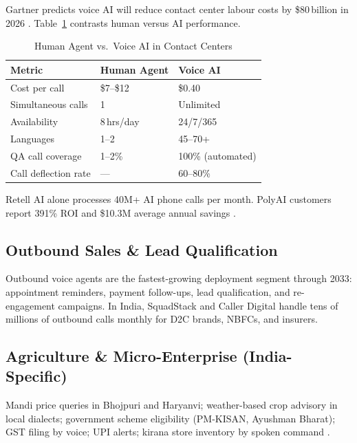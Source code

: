 \documentclass[12pt,a4paper]{article}
\begin{document}
Gartner predicts voice AI will reduce contact center labour costs by
\$80\,billion in 2026 \cite{nextlevel-roi}.  Table~\ref{tab:contact-center}
contrasts human versus AI performance.

\begin{table}[H]\centering
\caption{Human Agent vs.\ Voice AI in Contact Centers}
\label{tab:contact-center}
\begin{tabularx}{\textwidth}{lXX}
\toprule
\textbf{Metric} & \textbf{Human Agent} & \textbf{Voice AI} \\
\midrule
Cost per call        & \$7--\$12   & \$0.40 \\
Simultaneous calls   & 1           & Unlimited \\
Availability         & 8\,hrs/day  & 24/7/365 \\
Languages            & 1--2        & 45--70+ \\
QA call coverage     & 1--2\%      & 100\% (automated) \\
Call deflection rate & ---         & 60--80\% \\
\bottomrule
\end{tabularx}
\end{table}

Retell AI alone processes 40M+ AI phone calls per month.  PolyAI customers
report 391\% ROI and \$10.3M average annual savings \cite{assemblyai-voice2026}.

\subsection{Outbound Sales \& Lead Qualification}

Outbound voice agents are the fastest-growing deployment segment through
2033: appointment reminders, payment follow-ups, lead qualification, and
re-engagement campaigns.  In India, SquadStack and Caller Digital handle
tens of millions of outbound calls monthly for D2C brands, NBFCs, and
insurers.

\subsection{Agriculture \& Micro-Enterprise (India-Specific)}

Mandi price queries in Bhojpuri and Haryanvi; weather-based crop advisory
in local dialects; government scheme eligibility (PM-KISAN, Ayushman
Bharat); GST filing by voice; UPI alerts; kirana store inventory by spoken
command \cite{business-standard-india}.
\end{document}
